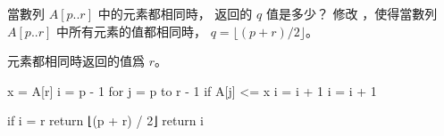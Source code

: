 當數列 $A[p..r]$ 中的元素都相同時，  返回的 $q$ 值是多少？
修改 ，使得當數列 $A[p..r]$ 中所有元素的值都相同時，
 $q=\lfloor (p+r)/2\rfloor$。
\stopEXERCISE

\startANSWER
元素都相同時返回的值爲 $r$。

\startCLRSCODE
x = A[r]
i = p - 1
for j = p to r - 1
	if A[j] <= x
		i = i + 1
i = i + 1

if i = r
	return ⌊(p + r) / 2⌋
return i
\stopCLRSCODE
\stopANSWER
